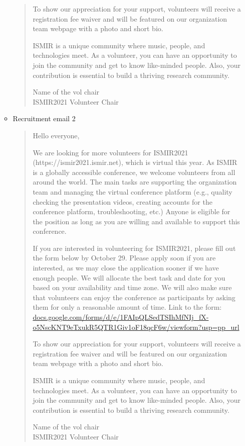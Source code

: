 \documentclass[%
10pt,								%
titlepage,						%
]
{scrartcl}
\begin{document}
\begin{itemize}
\begin{itemize}
\begin{quote}
To show our appreciation for your support, volunteers will receive a registration fee waiver and will be featured on our organization team webpage with a photo and short bio. 

ISMIR is a unique community where music, people, and technologies meet. As a volunteer, you can have an opportunity to join the community and get to know like-minded people. Also, your contribution is essential to build a thriving research community.  

Name of the vol chair\\
ISMIR2021 Volunteer Chair

                        \end{quote}
                    \item Recruitment email  2
                        \begin{quote}
                            Hello everyone, 

We are looking for more volunteers for ISMIR2021 (https://ismir2021.ismir.net), which is virtual this year. As ISMIR is a globally accessible conference, we welcome volunteers from all around the world. The main tasks are supporting the organization team and managing the virtual conference platform (e.g., quality checking the presentation videos, creating accounts for the conference platform, troubleshooting, etc.) Anyone is eligible for the position as long as you are willing and available to support this conference.

If you are interested in volunteering for ISMIR2021, please fill out the form below by October 29. Please apply soon if you are interested, as we may close the application sooner if we have enough people. We will allocate the best task and date for you based on your availability and time zone. We will also make sure that volunteers can enjoy the conference as participants by asking them for only a reasonable amount of time. 
Link to the form:\\ 
\href{https://docs.google.com/forms/d/e/1FAIpQLSedTSIhMfNIj_fX-o5NscKNT9eTxukR5QTR1Giv1oF18qcF6w/viewform?usp=pp_url}{docs.google.com/forms/d/e/1FAIpQLSedTSIhMfNIj\_fX-o5NscKNT9eTxukR5QTR1Giv1oF18qcF6w/viewform?usp=pp\_url}

To show our appreciation for your support, volunteers will receive a registration fee waiver and will be featured on our organization team webpage with a photo and short bio. 

ISMIR is a unique community where music, people, and technologies meet. As a volunteer, you can have an opportunity to join the community and get to know like-minded people. Also, your contribution is essential to build a thriving research community.  

Name of the vol chair\\
ISMIR2021 Volunteer Chair

                        \end{quote}
                \end{itemize}
        \end{itemize}
        
\end{document}

